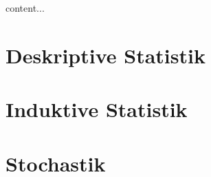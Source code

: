 \begin{definition}
	content...
\end{definition}

\pagebreak

\section{Deskriptive Statistik}

\section{Induktive Statistik}

\pagebreak

\section{Stochastik}

\pagebreak